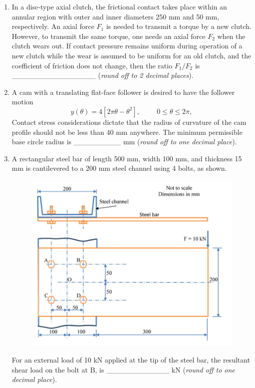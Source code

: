 \documentclass[12pt,onecolumn]{article}
\begin{document}
\begin{enumerate}
    \item In a disc-type axial clutch, the frictional contact takes place within an annular region with outer and inner diameters 250 mm and 50 mm, respectively. An axial force $F_1$ is needed to transmit a torque by a new clutch. However, to transmit the same torque, one needs an axial force $F_2$ when the clutch wears out. If contact pressure remains uniform during operation of a new clutch while the wear is assumed to be uniform for an old clutch, and the coefficient of friction does not change, then the ratio $F_1/F_2$ is \_\_\_\_\_\_\_\_\_\_\_\_\_\_\_\_ (\textit{round off to 2 decimal places}).

    \item A cam with a translating flat-face follower is desired to have the follower motion
          \[
              y(\theta) = 4 \left[ 2\pi\theta - \theta^2 \right],\hspace{1cm} 0 \le \theta \le 2\pi,
          \]
          Contact stress considerations dictate that the radius of curvature of the cam profile should not be less than 40 mm anywhere. The minimum permissible base circle radius is \_\_\_\_\_\_\_\_\_ mm (\textit{round off to one decimal place}).

    \item A rectangular steel bar of length 500 mm, width 100 mm, and thickness 15 mm is cantilevered to a 200 mm steel channel using 4 bolts, as shown.
          \begin{figure}[H]
              \centering
              \includegraphics[scale=0.5]{q39}
              \label{fig:q39}
          \end{figure}
          For an external load of 10 kN applied at the tip of the steel bar, the resultant shear load on the bolt at B, is \_\_\_\_\_\_\_\_\_\_\_\_ kN (\textit{round off to one decimal place}).


\end{enumerate}
\end{document}

